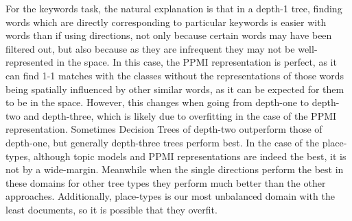 For the keywords task, the natural explanation is that in a depth-1 tree, finding words which are directly corresponding to particular keywords is easier with words than if using directions, not only because certain words may have been filtered out, but also because as they are infrequent they may not be well-represented in the space. In this case, the PPMI representation is perfect, as it can find 1-1 matches with the classes without the representations of those words being spatially influenced by other similar words, as it can be expected for them to be in the space. However, this changes when going from depth-one to depth-two and depth-three, which is likely  due to overfitting in the case of the PPMI representation. Sometimes Decision Trees of depth-two outperform those of depth-one, but generally depth-three trees perform best.  In the case of the place-types, although topic models and PPMI representations are indeed the best, it is not by a wide-margin. Meanwhile when the single directions perform the best in these domains for other tree types they perform much better than the other approaches. Additionally, place-types is our most unbalanced domain with the least documents, so it is possible that they overfit. 




